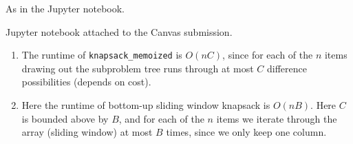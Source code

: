 \begin{prob}
    As in the Jupyter notebook.
\end{prob}
\begin{solution}
    Jupyter notebook attached to the Canvas submission.
    \begin{enumerate}[label=(\alph*)]
    \setlength\itemsep{-.2em}
\item The runtime of \texttt{knapsack\_memoized} is $O(nC)$, since for each of the $n$ items drawing out the subproblem tree runs through at most $C$ difference possibilities (depends on cost).
\item Here the runtime of bottom-up sliding window knapsack is $O(nB)$. Here $C$ is bounded above by $B$, and for each of the $n$ items we iterate through the array (sliding window) at most $B$ times, since we only keep one column.
    \end{enumerate}
\end{solution}
